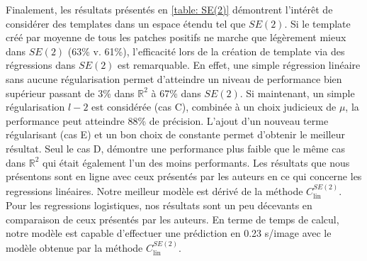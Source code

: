 \documentclass{article}
\begin{document}
Finalement, les résultats présentés en \ref{table: SE(2)} démontrent l'intérêt de considérer des templates dans un espace étendu tel que $SE(2)$.
Si le template créé par moyenne de tous les patches positifs ne marche que légèrement mieux dans $SE(2)$ (63\% v. 61\%), l'efficacité 
lors de la création de template via des régressions dans $SE(2)$ est remarquable. En effet, une simple régression linéaire sans aucune régularisation permet 
d'atteindre un niveau de performance bien supérieur passant de 3\% dans $\mathbb{R}^2$ à 67\% dans $SE(2)$. Si maintenant, 
un simple régularisation $l-2$ est considérée (cas C), combinée à un choix judicieux de $\mu$,  la performance peut atteindre 88\% de précision.
L'ajout d'un nouveau terme régularisant (cas E) et un bon choix de constante permet d'obtenir le meilleur résultat. Seul le cas D, démontre une 
performance plus faible que le même cas dans $\mathbb{R}^2$ qui était également l'un des moins performants. Les résultats que nous présentons sont en ligne avec ceux 
présentés par les auteurs en ce qui concerne les regressions linéaires. Notre meilleur modèle est dérivé de la méthode $C_{\text{lin}}^{SE(2)}$. Pour 
les regressions logistiques, nos résultats sont un peu décevants en comparaison de ceux présentés par les auteurs. 
En terme de temps de calcul, notre modèle est capable d'effectuer une prédiction en 0.23 s/image avec le modèle obtenue par la méthode $C_{\text{lin}}^{SE(2)}$.
\end{document}

